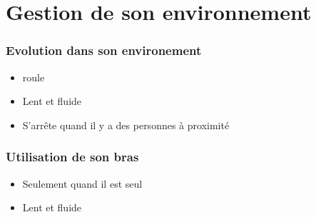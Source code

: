 \section{Gestion de son environnement}

\begin{frame}
	\frametitle{Evolution dans son environement}
	\begin{itemize}
	\item roule
	\item Lent et fluide
	\item S'arrête quand il y a des personnes à proximité
	\end{itemize}
\end{frame}

\begin{frame}
	\frametitle{Utilisation de son bras}
	\begin{itemize}
	\item Seulement quand il est seul
	\item Lent et fluide
	\end{itemize}
\end{frame}
